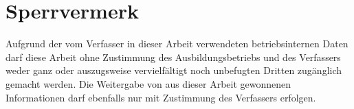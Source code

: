 
\newpage
\thispagestyle{empty}

\section*{Sperrvermerk}

Aufgrund der vom Verfasser in dieser Arbeit verwendeten betriebsinternen Daten darf diese Arbeit ohne Zustimmung des Ausbildungsbetriebs und des Verfassers weder ganz oder auszugsweise vervielfältigt noch unbefugten Dritten zugänglich gemacht werden. Die Weitergabe von aus dieser Arbeit gewonnenen Informationen darf ebenfalls nur mit Zustimmung des Verfassers erfolgen.
